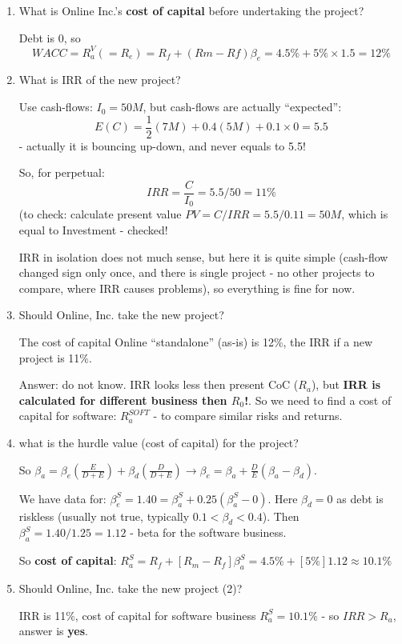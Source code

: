 \documentclass{scrartcl}
\begin{document}
\begin{enumerate}
\item What is Online Inc.'s {\bf cost of capital} before undertaking the project?

Debt is 0, so 
$$WACC = R_a^V (= R_e) = R_f + (Rm-Rf)\beta_e = 4.5\% + 5\% \times 1.5 = 12\%$$
\item What is IRR of the new project?

Use cash-flows: $I_0 = 50M$, but cash-flows are actually ``expected'':
$$E(C) = \frac12 (7M) + 0.4(5M) + 0.1 \times 0 = 5.5$$ 
- actually it is bouncing up-down, and never equals to 5.5! 

So, for perpetual:
$$IRR = \frac{C}{I_0} = 5.5/50 = 11\%$$
(to check: calculate present value $PV = C/IRR = 5.5/0.11 = 50M$, which is equal
to Investment - checked!

IRR in isolation does not much sense, but here it is quite simple (cash-flow
changed sign only once, and there is single project - no other projects to
compare, where IRR causes problems), so everything is fine for now.

\item Should Online, Inc. take the new project?

The cost of capital Online ``standalone'' (as-is) is 12\%, the IRR if a new
project is 11\%. 

Answer: do not know. IRR looks less then present CoC ($R_a$), but {\bf IRR is
  calculated for different business then $R_0$!}. So we need to find a cost of
capital for software: $R_a^{SOFT}$ - to compare similar risks and returns. 

\item what is the hurdle value (cost of capital) for the project?

So $\beta_a = \beta_e(\frac{E}{D+E}) + \beta_d(\frac{D}{D+E}) \to \beta_e =
\beta_a + \frac DE(\beta_a - \beta_d)$. 

We have data for: $\beta_e^S = 1.40 = \beta_a^S + 0.25(\beta_a^S - 0)$. Here
$\beta_d = 0$ as debt is riskless (usually not true, typically $0.1 < \beta_d <
0.4$). Then $\beta_a^S = 1.40/1.25 = 1.12$ - beta for the software business. 

So {\bf cost of capital}: $R_a^S = R_f + [R_m - R_f] \beta_a^S = 4.5\% + [5\%] 1.12
\approx 10.1\%$

\item Should Online, Inc. take the new project (2)?

IRR is 11\%, cost of capital for software business $R_a^S = 10.1\%$ - so $IRR >
R_a$, answer is {\bf yes}.


\end{enumerate}
\end{document}
